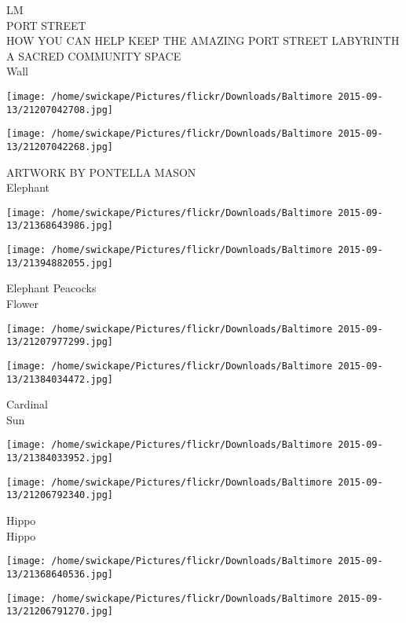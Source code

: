 \documentclass[10pt,letterpaper]{article}
\begin{document}
LM\\
PORT STREET\\
HOW YOU CAN HELP KEEP THE AMAZING PORT STREET LABYRINTH A SACRED COMMUNITY SPACE\\
Wall\\
\pagebreak

\texttt{[image: /home/swickape/Pictures/flickr/Downloads/Baltimore 2015-09-13/21207042708.jpg]}

\vspace{0.25in}
\texttt{[image: /home/swickape/Pictures/flickr/Downloads/Baltimore 2015-09-13/21207042268.jpg]}

ARTWORK BY PONTELLA MASON\\
Elephant\\
\pagebreak

\texttt{[image: /home/swickape/Pictures/flickr/Downloads/Baltimore 2015-09-13/21368643986.jpg]}

\vspace{0.25in}
\texttt{[image: /home/swickape/Pictures/flickr/Downloads/Baltimore 2015-09-13/21394882055.jpg]}

Elephant Peacocks\\
Flower\\
\pagebreak

\texttt{[image: /home/swickape/Pictures/flickr/Downloads/Baltimore 2015-09-13/21207977299.jpg]}

\vspace{0.25in}
\texttt{[image: /home/swickape/Pictures/flickr/Downloads/Baltimore 2015-09-13/21384034472.jpg]}

Cardinal\\
Sun\\
\pagebreak

\texttt{[image: /home/swickape/Pictures/flickr/Downloads/Baltimore 2015-09-13/21384033952.jpg]}

\vspace{0.25in}
\texttt{[image: /home/swickape/Pictures/flickr/Downloads/Baltimore 2015-09-13/21206792340.jpg]}

Hippo\\
Hippo\\
\pagebreak

\texttt{[image: /home/swickape/Pictures/flickr/Downloads/Baltimore 2015-09-13/21368640536.jpg]}

\vspace{0.25in}
\texttt{[image: /home/swickape/Pictures/flickr/Downloads/Baltimore 2015-09-13/21206791270.jpg]}
\end{document}
